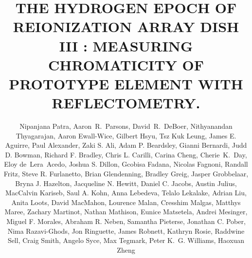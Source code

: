 \documentclass[twocolumn]{emulateapj}
\def\UCB{\altaffilmark{1}}
\def\ASU{\altaffilmark{2}}
\def\myemail{\altaffilmark{$\dagger$}}
\begin{document}
    
    \title{THE HYDROGEN EPOCH OF REIONIZATION ARRAY DISH III : MEASURING CHROMATICITY OF PROTOTYPE ELEMENT WITH REFLECTOMETRY. } 
    
    \author{
    Nipanjana Patra\UCB\myemail,
    Aaron~R.~Parsons\UCB,
    David~R.~DeBoer\UCB,
    Nithyanandan Thyagarajan\ASU,
    Aaron  Ewall-Wice,
    Gilbert Hsyu\UCB, 
    Tsz Kuk Leung\UCB,
    James E. Aguirre, Paul  Alexander, Zaki S. Ali, Adam P. Beardsley, Gianni  Bernardi, Judd D. Bowman, Richard F. Bradley, Chris L. Carilli, Carina  Cheng, Cherie~K.~Day\UCB, Eloy  de~Lera~Acedo, Joshua S. Dillon, Gcobisa  Fadana, Nicolas  Fagnoni, Randall  Fritz, Steve R. Furlanetto, Brian  Glendenning, Bradley  Greig, Jasper  Grobbelaar, Bryna J. Hazelton, Jacqueline N. Hewitt, Daniel C. Jacobs, Austin  Julius, MacCalvin  Kariseb, Saul A. Kohn, Anna Lebedeva\UCB, Telalo  Lekalake, Adrian  Liu, Anita  Loots, David  MacMahon, Lourence  Malan, Cresshim  Malgas, Matthys  Maree, Zachary  Martinot, Nathan  Mathison, Eunice  Matsetela, Andrei  Mesinger, Miguel F. Morales, Abraham R. Neben,  Samantha  Pieterse, Jonathan C. Pober, Nima  Razavi-Ghods, Jon  Ringuette, James  Robnett, Kathryn  Rosie, Raddwine  Sell, Craig  Smith, Angelo  Syce, Max  Tegmark, Peter K.~G. Williams, Haoxuan  Zheng
    }
    
\end{document}
